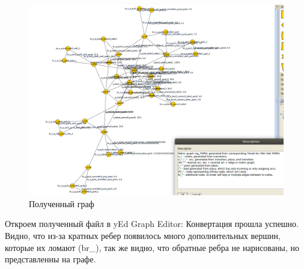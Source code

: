 \documentclass{../TechDoc}
\begin{document}
	\newpage
	\begin{figure}[h!]
		\centering
		\includegraphics[width=0.9\linewidth]{yed}
		\caption{Полученный граф}
		\label{fig:yed}
	\end{figure}
	Откроем полученный файл в yEd Graph Editor\cite{yededitor}:
	Конвертация прошла успешно. Видно, что из-за кратных ребер появилось много дополнительных вершин, которые их ломают (br\_), так же видно, что обратные ребра не нарисованы, но представленны на графе.
	
	
	
	\newpage
	\addtocounter{section}{2}
	
	\registrationList
\end{document}
